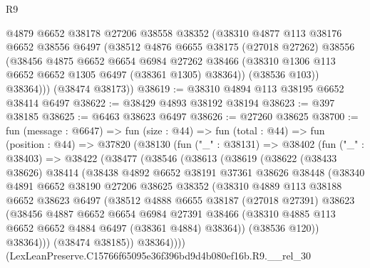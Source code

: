 \begin{lexlean}{R9}
\begin{coremodule}
          @4879
          @6652
          @38178
          @27206
          @38558
          @38352
          (@38310
            @4877
            @113
            @38176
            @6652
            @38556
            @6497
            (@38512
              @4876
              @6655
              @38175
              (@27018 @27262)
              @38556
              (@38456
                @4875
                @6652
                @6654
                @6984
                @27262
                @38466
                (@38310 @1306 @113 @6652 @6652 @1305 @6497 (@38361 @1305) @38364))
              (@38536 @103))
            @38364)))
      (@38474 @38173))
@38619 := @38310 @4894 @113 @38195 @6652 @38414 @6497
@38622 := @38429 @4893 @38192 @38194
@38623 := @397 @38185
@38625 := @6463 @38623 @6497
@38626 := @27260 @38625
@38700 := fun (message : @6647) =>
  fun (size : @44) =>
  fun (total : @44) =>
  fun (position : @44) =>
  @37820
    (@38130
      (fun ("_" : @38131) =>
      @38402
        (fun ("_" : @38403) =>
        @38422
          (@38477
            (@38546
              (@38613
                (@38619
                  (@38622
                    (@38433 @38626)
                    @38414
                    (@38438
                      @4892
                      @6652
                      @38191
                      @37361
                      @38626
                      @38448
                      (@38340
                        @4891
                        @6652
                        @38190
                        @27206
                        @38625
                        @38352
                        (@38310
                          @4889
                          @113
                          @38188
                          @6652
                          @38623
                          @6497
                          (@38512
                            @4888
                            @6655
                            @38187
                            (@27018 @27391)
                            @38623
                            (@38456
                              @4887
                              @6652
                              @6654
                              @6984
                              @27391
                              @38466
                              (@38310 @4885 @113 @6652 @6652 @4884 @6497 (@38361 @4884) @38364))
                            (@38536 @120))
                          @38364)))
                    (@38474 @38185))
                  @38364))))
          (LexLeanPreserve.C15766f65095e36f396bd9d4b080ef16b.R9.__rel_30

\end{coremodule}
\end{lexlean}
